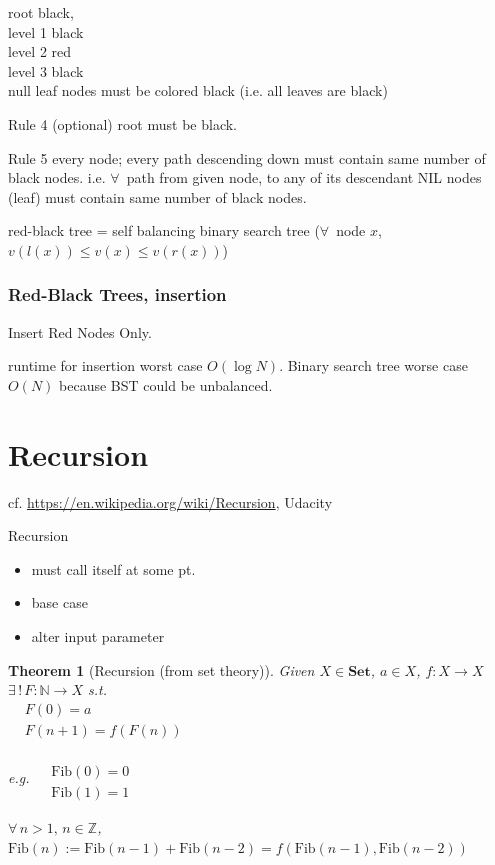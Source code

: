 \documentclass[10pt]{amsart}
\newtheorem{theorem}{Theorem}
\begin{document}
root black, \\
level 1 black \\
level 2 red \\
level 3 black \\

null leaf nodes must be colored black (i.e. all leaves are black)

Rule 4 (optional) root must be black.

Rule 5 every node; every path descending down must contain same number of black nodes. i.e. $\forall\, $ path from given node, to any of its descendant NIL nodes (leaf) must contain same number of black nodes. 

red-black tree = self balancing binary search tree ($\forall \, $ node $x$, $v(l(x)) \leq v(x) \leq v(r(x))$)

\subsubsection{Red-Black Trees, insertion}

Insert Red Nodes Only. 

runtime for insertion worst case $O(\log{N})$. Binary search tree worse case $O(N)$ because BST could be unbalanced. 




\section{Recursion}

cf. \url{https://en.wikipedia.org/wiki/Recursion},  Udacity 

Recursion
\begin{itemize}
	\item must call itself at some pt.
	\item base case
	\item alter input parameter
\end{itemize}

\begin{theorem}[Recursion (from set theory)]
	Given $X \in \textbf{Set}$, $a\in X$, $f:X \to X$ \\
	$\exists \, ! \, F: \mathbb{N} \to X$ s.t. \\
	$\begin{aligned}
	& F(0) = a \\
	& F(n+1) = f(F(n))
	\end{aligned}$
	
	e.g. $\begin{aligned} & \quad \\ 
	& \text{Fib}(0) = 0  \\
	& \text{Fib}(1) = 1 \end{aligned}$ 
	
	$\forall \, n > 1, \, n \in \mathbb{Z}$, $\text{Fib}(n) := \text{Fib}(n-1) + \text{Fib}(n-2) = f(\text{Fib}(n-1), \text{Fib}(n-2))$
\end{theorem} 
\end{document}
